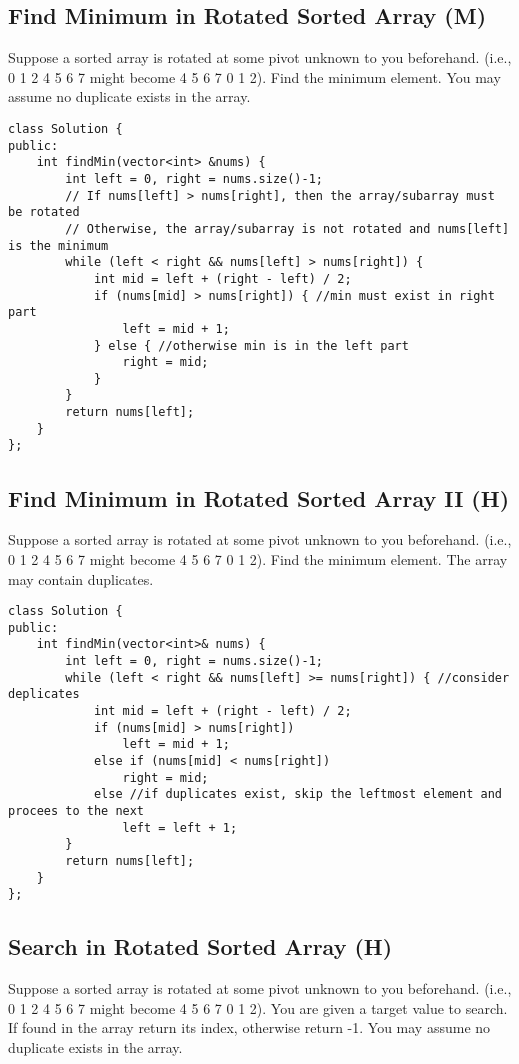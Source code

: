 \subsection{Find Minimum in Rotated Sorted Array (M)}
Suppose a sorted array is rotated at some pivot unknown to you beforehand.
(i.e., 0 1 2 4 5 6 7 might become 4 5 6 7 0 1 2).
Find the minimum element.
You may assume no duplicate exists in the array.\\

\begin{lstlisting}
class Solution {
public:
    int findMin(vector<int> &nums) {
        int left = 0, right = nums.size()-1;
        // If nums[left] > nums[right], then the array/subarray must be rotated 
        // Otherwise, the array/subarray is not rotated and nums[left] is the minimum
        while (left < right && nums[left] > nums[right]) {
            int mid = left + (right - left) / 2;
            if (nums[mid] > nums[right]) { //min must exist in right part
                left = mid + 1;
            } else { //otherwise min is in the left part
                right = mid;
            }
        }
        return nums[left];
    }
};
\end{lstlisting}


\subsection{Find Minimum in Rotated Sorted Array II (H)}
Suppose a sorted array is rotated at some pivot unknown to you beforehand.
(i.e., 0 1 2 4 5 6 7 might become 4 5 6 7 0 1 2).
Find the minimum element.
The array may contain duplicates.\\

\begin{lstlisting}
class Solution {
public:
    int findMin(vector<int>& nums) {
        int left = 0, right = nums.size()-1;
        while (left < right && nums[left] >= nums[right]) { //consider deplicates
            int mid = left + (right - left) / 2;
            if (nums[mid] > nums[right])
                left = mid + 1;
            else if (nums[mid] < nums[right])
                right = mid;
            else //if duplicates exist, skip the leftmost element and procees to the next
                left = left + 1;
        }
        return nums[left];
    }
};
\end{lstlisting}


\subsection{Search in Rotated Sorted Array (H)}
Suppose a sorted array is rotated at some pivot unknown to you beforehand.
(i.e., 0 1 2 4 5 6 7 might become 4 5 6 7 0 1 2).
You are given a target value to search. If found in the array return its index, otherwise return -1.
You may assume no duplicate exists in the array.\\


